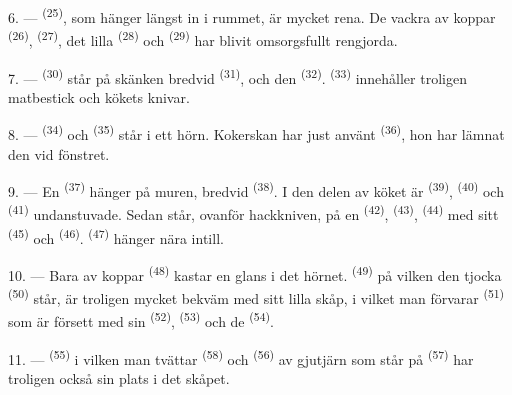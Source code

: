 \VUsaut{4.0mm}
\VUsaut{3.0mm}

6. ---  \textsuperscript{(25)}, som hänger längst in i rummet, är mycket
rena. De vackra  av koppar \textsuperscript{(26)}, 
\textsuperscript{(27)}, det lilla
 \textsuperscript{(28)} och 
\textsuperscript{(29)} har blivit omsorgsfullt rengjorda.

7. ---  \textsuperscript{(30)} står på skänken bredvid
 \textsuperscript{(31)}, och den 
\textsuperscript{(32)}.  \textsuperscript{(33)} innehåller troligen matbestick
och kökets knivar.

8. ---  \textsuperscript{(34)} och  \textsuperscript{(35)}
står i ett hörn. Kokerskan har just använt
 \textsuperscript{(36)}, hon har lämnat den vid fönstret.

9. --- En  \textsuperscript{(37)} hänger på muren, bredvid
 \textsuperscript{(38)}. I den delen av köket är
 \textsuperscript{(39)}, 
\textsuperscript{(40)} och  \textsuperscript{(41)} undanstuvade. Sedan
står, ovanför hackkniven, på en  \textsuperscript{(42)}, 
\textsuperscript{(43)},
 \textsuperscript{(44)} med sitt 
\textsuperscript{(45)} och  \textsuperscript{(46)}.
 \textsuperscript{(47)} hänger nära intill.

10. --- Bara  av koppar \textsuperscript{(48)} kastar en glans i det hörnet.
 \textsuperscript{(49)} på vilken den tjocka
 \textsuperscript{(50)} står, är troligen mycket bekväm med
sitt lilla skåp, i vilket man förvarar  \textsuperscript{(51)} som är
försett med sin  \textsuperscript{(52)}, 
\textsuperscript{(53)} och de
 \textsuperscript{(54)}.

\VUsaut{4.0mm}
\VUsaut{3.0mm}

11. ---  \textsuperscript{(55)} i vilken man tvättar
 \textsuperscript{(58)} och 
\textsuperscript{(56)} av gjutjärn som står på  \textsuperscript{(57)} har
troligen också sin plats i det skåpet.

